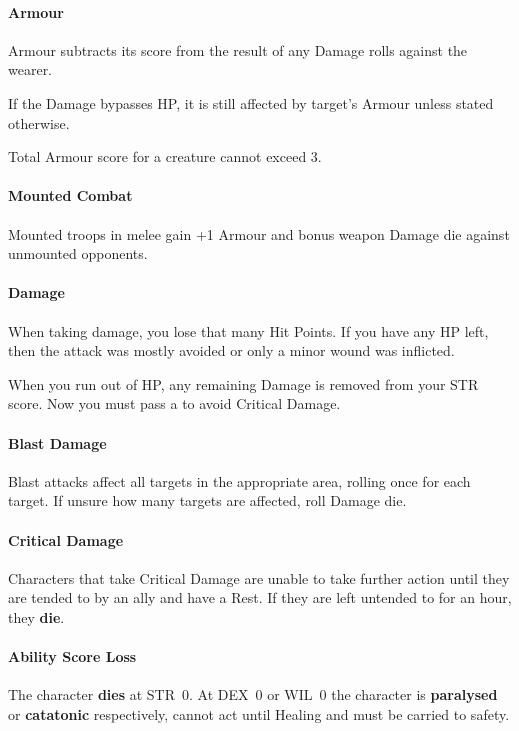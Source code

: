 \documentclass[itdr]{subfiles}
\begin{document}
\vfill
\paragraph{Armour}
Armour subtracts its score from the result of any Damage rolls against the wearer.

If the Damage bypasses HP, it is still affected by target's Armour unless stated otherwise.

Total Armour score for a creature cannot exceed 3.

\vfill
\paragraph{Mounted Combat}

Mounted troops in melee gain +1 Armour and bonus weapon Damage die against unmounted opponents.

\vfill
\paragraph{Damage}
When taking damage, you lose that many Hit Points. If you have any HP left, then the attack was mostly avoided or only a minor wound was inflicted.

When you run out of HP, any remaining Damage is removed from your STR score. Now you must pass a  to avoid Critical Damage.

\vfill
\paragraph{Blast Damage}
Blast attacks affect all targets in the appropriate area, rolling once for each target. If unsure how many targets are affected, roll Damage die.

\vfill
\paragraph{Critical Damage}
Characters that take Critical Damage are unable to take further action until they are tended to by an ally and have a Rest. If they are left untended to for an hour, they \textbf{die}.

\vfill
\paragraph{Ability Score Loss}
The character \textbf{dies} at STR~0. At DEX~0 or WIL~0 the character is \textbf{paralysed} or \textbf{catatonic} respectively, cannot act until Healing and must be carried to safety.
\end{document}
